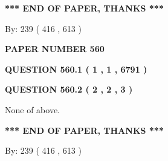 \documentclass[12pt]{article}
\begin{document}
 
 
 
   
   
 \vspace{0.2in}
 
   
   
   
   
\vspace{1.0in} 
{\textbf{\large{ *** END OF PAPER, THANKS *** }}} 
   
   
\hspace{1.0in} By: 
 239 ( 416 ,  613 )
   
   
   
   
\newpage 
\setcounter{page}{ 
   560001 } 
   
   
   
   
 {\textbf{ \Large{ PAPER NUMBER  560  }}}
   
   
\vspace{0.2in}
   
   
   
   
   
   
 \vspace{0.2in}
 
 
 
 
   
   
  
\vspace{0.2in}
  
{\textbf{\Large{QUESTION
560.1 
 ( 1 , 1 , 6791 )
}}}
  
  
  
\vspace{0.2in}
  
{\textbf{\Large{QUESTION
560.2 
 ( 2 , 2 , 3 )
}}}
  
  
 
 
\noindent{}
 
 
 None of above.
 
 
 
 
   
   
 \vspace{0.2in}
 
   
   
   
   
\vspace{1.0in} 
{\textbf{\large{ *** END OF PAPER, THANKS *** }}} 
   
   
\hspace{1.0in} By: 
 239 ( 416 ,  613 )
   
\end{document}
